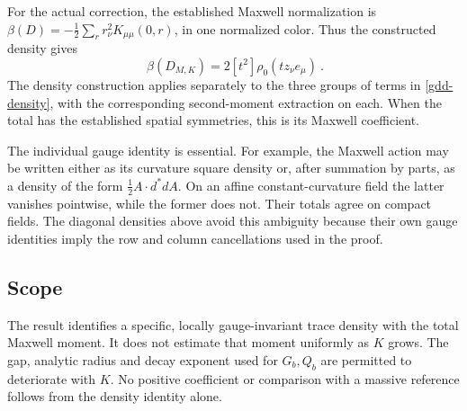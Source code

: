 For the actual correction, the established Maxwell
normalization is
\(\beta(D)=-\tfrac12\sum_r r_\nu^2K_{\mu\mu}(0,r)\),
in one normalized color. Thus the constructed density gives
\begin{equation}
                  \boxed{\ \beta(D_{M,K})
                            =2[t^2]\rho_0(tz_\nu e_\mu)\ }.
 \label{gdd-beta-density}
\end{equation}
The density construction applies separately to the
three groups of terms in \eqref{gdd-density}, with the
corresponding second-moment extraction on each.
When the total has the established spatial symmetries,
this is its Maxwell coefficient.

The individual gauge identity is essential. For example,
the Maxwell action may be written either as its curvature
square density or, after summation by parts, as a density
of the form \(\tfrac12 A\cdot d^*dA\). On an affine
constant-curvature field the latter vanishes pointwise,
while the former does not. Their totals agree on compact
fields. The diagonal densities above avoid this ambiguity
because their own gauge identities imply the row and
column cancellations used in the proof.

\subsection{Scope}
\label{gdd-scope}

The result identifies a specific, locally gauge-invariant
trace density with the total Maxwell moment. It does not
estimate that moment uniformly as \(K\) grows. The gap,
analytic radius and decay exponent used for \(G_b,Q_b\)
are permitted to deteriorate with \(K\). No positive
coefficient or comparison with a massive reference
follows from the density identity alone.
